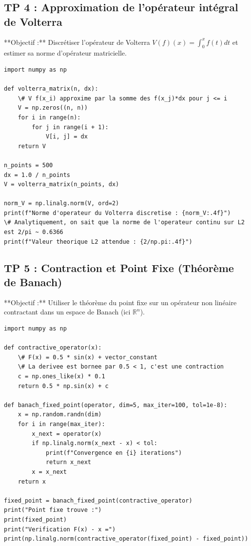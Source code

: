\documentclass[11pt,a4paper]{article}
\begin{document}
\subsection*{TP 4 : Approximation de l'opérateur intégral de Volterra}

**Objectif :**
Discrétiser l'opérateur de Volterra $V(f)(x) = \int_0^x f(t)dt$ et estimer sa norme d'opérateur matricielle.

\begin{lstlisting}
import numpy as np

def volterra_matrix(n, dx):
    \# V f(x_i) approxime par la somme des f(x_j)*dx pour j <= i
    V = np.zeros((n, n))
    for i in range(n):
        for j in range(i + 1):
            V[i, j] = dx
    return V

n_points = 500
dx = 1.0 / n_points
V = volterra_matrix(n_points, dx)

norm_V = np.linalg.norm(V, ord=2)
print(f"Norme d'operateur du Volterra discretise : {norm_V:.4f}")
\# Analytiquement, on sait que la norme de l'operateur continu sur L2 est 2/pi ~ 0.6366
print(f"Valeur theorique L2 attendue : {2/np.pi:.4f}")

\end{lstlisting}


\subsection*{TP 5 : Contraction et Point Fixe (Théorème de Banach)}

**Objectif :**
Utiliser le théorème du point fixe sur un opérateur non linéaire contractant dans un espace de Banach (ici $\mathbb{R}^n$).

\begin{lstlisting}
import numpy as np

def contractive_operator(x):
    \# F(x) = 0.5 * sin(x) + vector_constant
    \# La derivee est bornee par 0.5 < 1, c'est une contraction
    c = np.ones_like(x) * 0.1
    return 0.5 * np.sin(x) + c

def banach_fixed_point(operator, dim=5, max_iter=100, tol=1e-8):
    x = np.random.randn(dim)
    for i in range(max_iter):
        x_next = operator(x)
        if np.linalg.norm(x_next - x) < tol:
            print(f"Convergence en {i} iterations")
            return x_next
        x = x_next
    return x

fixed_point = banach_fixed_point(contractive_operator)
print("Point fixe trouve :")
print(fixed_point)
print("Verification F(x) - x =")
print(np.linalg.norm(contractive_operator(fixed_point) - fixed_point))

\end{lstlisting}
\end{document}

